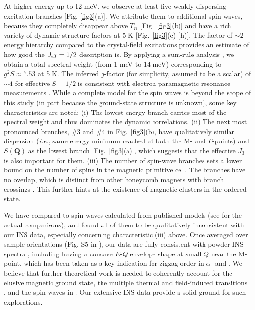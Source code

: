 \documentclass[%
reprint,
superscriptaddress,
amsmath,amssymb,
aps,
prb,
]{revtex4-2}
\begin{document}
At higher energy up to 12 meV, we observe at least five weakly-dispersing excitation branches [Fig. \ref{fig3}(a)]. We attribute them to additional spin waves, because they completely disappear above $T_\mathrm{N}$ [Fig.~\ref{fig3}(b)] and have a rich variety of dynamic structure factors at 5 K [Fig.~\ref{fig3}(c)-(h)]. The factor of $\sim2$ energy hierarchy compared to the crystal-field excitations provides an estimate of how good the $J_{\rm{eff}} = 1/2$ description is. By applying a sum-rule analysis \cite{XuRSI2013,LorenzanaPRB2005,SM}, we obtain a total spectral weight (from 1 meV to 14 meV) corresponding to $g^2S \approx 7.53$ at 5 K. The inferred $g$-factor (for simplicity, assumed to be a scalar) of $\sim4$ for effective $S=1/2$ is consistent with electron paramagnetic resonance measurements \cite{LinNC2021}. While a complete model for the spin waves is beyond the scope of this study (in part because the ground-state structure is unknown), some key characteristics are noted: (i) The lowest-energy branch carries most of the spectral weight and thus dominates the dynamic correlations. (ii) The next most pronounced branches, $\#$3 and $\#$4 in Fig.~\ref{fig3}(b), have qualitatively similar dispersion (\textit{i.e.}, same energy minimum reached at both the M- and $\Gamma$-points) and $S(\mathbf{Q})$ as the lowest branch [Fig.~\ref{fig3}(a)], which suggests that the effective $J_3$ is also important for them. (iii) The number of spin-wave branches sets a lower bound on the number of spins in the magnetic primitive cell. The branches have no overlap, which is distinct from other honeycomb magnets with branch crossings \cite{ChoiPRL2012,ChenPRX2018,YuanPRX2020,GaoPRB2021}. This further hints at the existence of magnetic clusters \cite{FurrerRMP2013} in the ordered state.
	
We have compared to spin waves calculated from published models (see \cite{SM} for the actual comparisons), and found all of them to be qualitatively inconsistent with our INS data, especially concerning characteristic (iii) above. Once averaged over sample orientations (Fig. S5 in \cite{SM}), our data are fully consistent with powder INS spectra \cite{SongvilayPRB2020,LinNC2021,SamarakoonPRB2021,KimJPCM2021,SandersArxiv2021}, including having a concave $E$-$Q$ envelope shape at small $Q$ near the M-point, which has been taken as a key indication for zigzag order in $\alpha$- and  \cite{BanerjeeNM2016,ChoiPRL2012,Takagi2019}. We believe that further theoretical work is needed to coherently account for the elusive magnetic ground state, the multiple thermal \cite{YaoPRB2020,XPRB2021} and field-induced transitions \cite{YaoPRB2020,LinNC2021}, and the spin waves in . Our extensive INS data provide a solid ground for such explorations.
\end{document}
